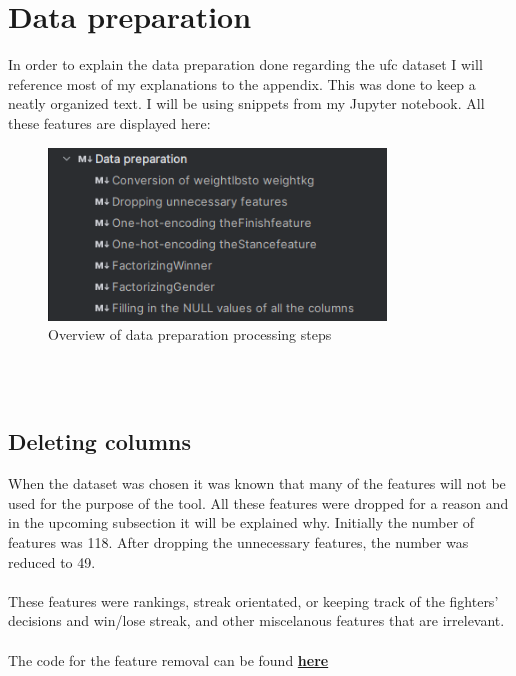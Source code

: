 \documentclass{article}
\begin{document}
 \section{Data preparation}
  In order to explain the data preparation done regarding the ufc dataset I will reference most of my explanations to the appendix. This was done to keep a neatly organized
  text. I will be using snippets from my Jupyter notebook. All these features are displayed here: \\
  \begin{figure}
    \centering
    \includegraphics[width=0.8\textwidth]{images/ToC_Data_cleaning.png}
    \caption{Overview of data preparation processing steps}
  \end{figure}\\\\

  \subsection{Deleting columns}
 
  When the dataset was chosen it was known that many of the features will not be used for the purpose of the tool. All these features were dropped for a reason and in the 
  upcoming subsection it will be explained why. Initially the number of features was 118. After dropping the unnecessary features, the number was reduced to 49.\\\\ 
  These features were rankings, streak orientated, or keeping track of the fighters' decisions and win/lose streak, and other miscelanous features that are irrelevant.\\\\ 
  The code for the feature removal can be found \href{fig:features_dropped}{\textbf{here}}
\end{document}
